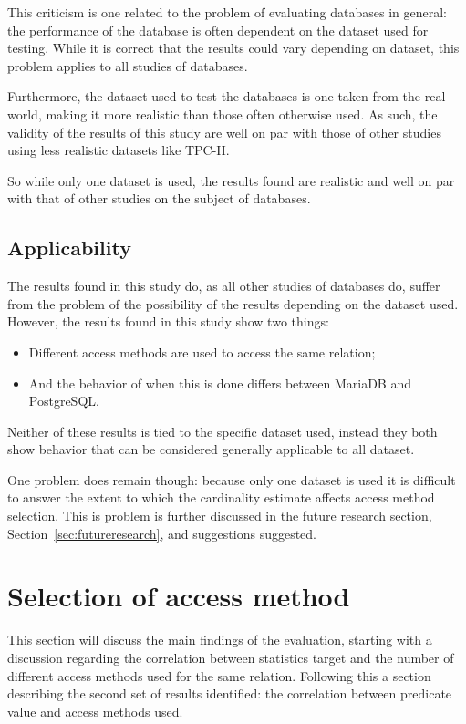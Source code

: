 This criticism is one related to the problem of evaluating databases in general:
the performance of the database is often dependent on the dataset used for
testing. While it is correct that the results could vary depending on dataset,
this problem applies to all studies of databases.

Furthermore, the dataset used to test the databases is one taken from the real
world, making it more realistic than those often otherwise used. As such, the
validity of the results of this study are well on par with those of other
studies using less realistic datasets like TPC-H.

So while only one dataset is used, the results found are realistic and well on
par with that of other studies on the subject of databases.

\subsection{Applicability}
The results found in this study do, as all other studies of databases do, suffer
from the problem of the possibility of the results depending on the dataset
used. However, the results found in this study show two things:
\begin{itemize}
\item Different access methods are used to access the same relation;
\item And the behavior of when this is done differs between MariaDB and
  PostgreSQL.\@
\end{itemize}

Neither of these results is tied to the specific dataset used, instead they
both show behavior that can be considered generally applicable to all dataset.

One problem does remain though: because only one dataset is used it is difficult
to answer the extent to which the cardinality estimate affects access method
selection. This is problem is further discussed in the future research section,
Section~\ref{sec:futureresearch}, and suggestions suggested.

\section{Selection of access method}\label{sec:accessmethods}
This section will discuss the main findings of the evaluation, starting with a
discussion regarding the correlation between statistics target and the number of
different access methods used for the same relation. Following this a section
describing the second set of results identified: the correlation between
predicate value and access methods used.

